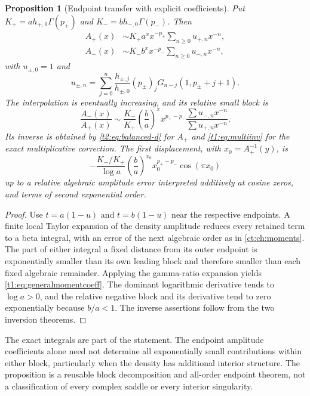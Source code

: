 \documentclass[11pt,openany]{book}
\numberwithin{equation}{chapter}
\theoremstyle{plain}
\newtheorem{proposition}[theorem]{Proposition}
\theoremstyle{definition}
\theoremstyle{remark}
\begin{document}
\begin{proposition}[Endpoint transfer with explicit coefficients]\label{t1:prop:endpointtransfer}
Put $K_+=a h_{+,0}\Gamma(p_+)$ and $K_-=b h_{-,0}\Gamma(p_-)$. Then
\begin{align}
 A_+(x)&\sim K_+a^xx^{-p_+}\sum_{n\ge0}u_{+,n}x^{-n},\nonumber\\
 A_-(x)&\sim K_-b^xx^{-p_-}\sum_{n\ge0}u_{-,n}x^{-n},
 \label{t1:eq:generalmomentblocks}
\end{align}
with $u_{\pm,0}=1$ and
\begin{equation}
 u_{\pm,n}=\sum_{j=0}^n
 \frac{h_{\pm,j}}{h_{\pm,0}}(p_\pm)_j
 G_{n-j}(1,p_\pm+j+1).
 \label{t1:eq:generalmomentcoeff}
\end{equation}
The interpolation is eventually increasing, and its relative small block is
\begin{equation}
 \frac{A_-(x)}{A_+(x)}\sim
 \frac{K_-}{K_+}\left(\frac ba\right)^x
 x^{p_+-p_-}\frac{\sum u_{-,n}x^{-n}}{\sum u_{+,n}x^{-n}}.
 \label{t1:eq:generalmomentr}
\end{equation}
Its inverse is obtained by \eqref{t2:eq:balanced-d} for $A_+$ and \eqref{t1:eq:multiinv} for the exact multiplicative correction. The first displacement, with $x_0=A_+^{-1}(y)$, is
\begin{equation}
 -\frac{K_-/K_+}{\log a}
 \left(\frac ba\right)^{x_0}x_0^{p_+-p_-}\cos(\pi x_0)
\end{equation}
up to a relative algebraic amplitude error interpreted additively at cosine zeros, and terms of second exponential order.
\end{proposition}
\begin{proof}
Use $t=a(1-u)$ and $t=b(1-u)$ near the respective endpoints. A finite local Taylor expansion of the density amplitude reduces every retained term to a beta integral, with an error of the next algebraic order as in \cref{ct:ch:moments}. The part of either integral a fixed distance from its outer endpoint is exponentially smaller than its own leading block and therefore smaller than each fixed algebraic remainder. Applying the gamma-ratio expansion yields \eqref{t1:eq:generalmomentcoeff}. The dominant logarithmic derivative tends to $\log a>0$, and the relative negative block and its derivative tend to zero exponentially because $b/a<1$. The inverse assertions follow from the two inversion theorems.
\end{proof}

The exact integrals are part of the statement. The endpoint amplitude coefficients alone need not determine all exponentially small contributions within either block, particularly when the density has additional interior structure. The proposition is a reusable block decomposition and all-order endpoint theorem, not a classification of every complex saddle or every interior singularity.
\end{document}
